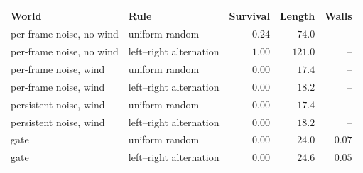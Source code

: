\begin{tabular}{llrrr}
\toprule
\rowcolor{Navy!8}
World & Rule & Survival & Length & Walls \\
\midrule
per-frame noise, no wind & uniform random & $0.24$ & $74.0$ & -- \\
per-frame noise, no wind & left--right alternation & $1.00$ & $121.0$ & -- \\
per-frame noise, wind & uniform random & $0.00$ & $17.4$ & -- \\
per-frame noise, wind & left--right alternation & $0.00$ & $18.2$ & -- \\
persistent noise, wind & uniform random & $0.00$ & $17.4$ & -- \\
persistent noise, wind & left--right alternation & $0.00$ & $18.2$ & -- \\
gate & uniform random & $0.00$ & $24.0$ & $0.07$ \\
gate & left--right alternation & $0.00$ & $24.6$ & $0.05$ \\
\bottomrule
\end{tabular}
